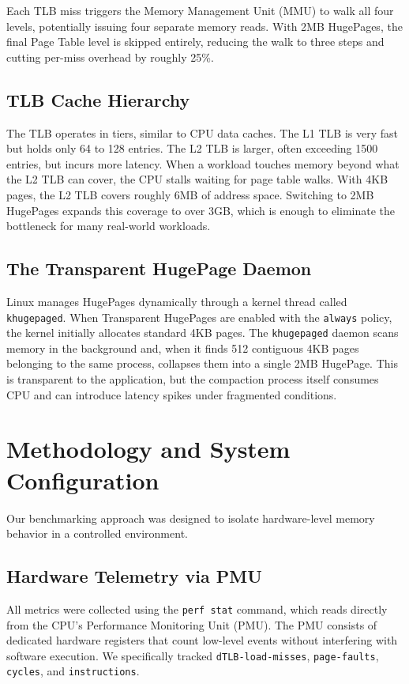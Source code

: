 \documentclass[conference]{IEEEtran}
\begin{document}
Each TLB miss triggers the Memory Management Unit (MMU) to walk all four levels, potentially issuing four separate memory reads. With 2MB HugePages, the final Page Table level is skipped entirely, reducing the walk to three steps and cutting per-miss overhead by roughly 25\%.

\subsection{TLB Cache Hierarchy}
The TLB operates in tiers, similar to CPU data caches. The L1 TLB is very fast but holds only 64 to 128 entries. The L2 TLB is larger, often exceeding 1500 entries, but incurs more latency. When a workload touches memory beyond what the L2 TLB can cover, the CPU stalls waiting for page table walks. With 4KB pages, the L2 TLB covers roughly 6MB of address space. Switching to 2MB HugePages expands this coverage to over 3GB, which is enough to eliminate the bottleneck for many real-world workloads.

\subsection{The Transparent HugePage Daemon}
Linux manages HugePages dynamically through a kernel thread called \texttt{khugepaged}. When Transparent HugePages are enabled with the \texttt{always} policy, the kernel initially allocates standard 4KB pages. The \texttt{khugepaged} daemon scans memory in the background and, when it finds 512 contiguous 4KB pages belonging to the same process, collapses them into a single 2MB HugePage. This is transparent to the application, but the compaction process itself consumes CPU and can introduce latency spikes under fragmented conditions.

\section{Methodology and System Configuration}
Our benchmarking approach was designed to isolate hardware-level memory behavior in a controlled environment.

\subsection{Hardware Telemetry via PMU}
All metrics were collected using the \texttt{perf stat} command, which reads directly from the CPU's Performance Monitoring Unit (PMU). The PMU consists of dedicated hardware registers that count low-level events without interfering with software execution. We specifically tracked \texttt{dTLB-load-misses}, \texttt{page-faults}, \texttt{cycles}, and \texttt{instructions}.
\end{document}
